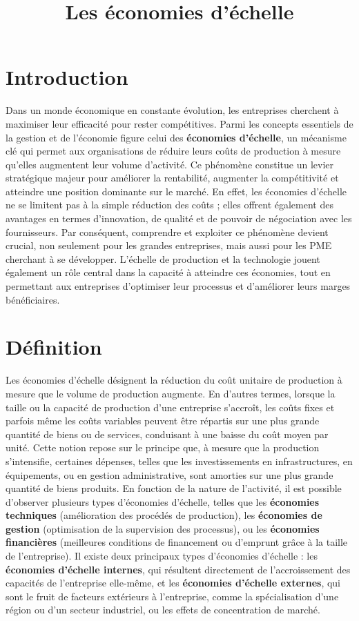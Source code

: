 \documentclass[a4paper,12pt]{article}
\title{Les économies d'échelle}
\author{}
\date{}
\begin{document}
\maketitle

\section*{Introduction}

Dans un monde économique en constante évolution, les entreprises cherchent à
maximiser leur efficacité pour rester compétitives. Parmi les concepts
essentiels de la gestion et de l’économie figure celui des \textbf{économies
  d’échelle}, un mécanisme clé qui permet aux organisations de réduire leurs
coûts de production à mesure qu’elles augmentent leur volume d’activité. Ce
phénomène constitue un levier stratégique majeur pour améliorer la rentabilité,
augmenter la compétitivité et atteindre une position dominante sur le marché.
En effet, les économies d’échelle ne se limitent pas à la simple réduction des
coûts ; elles offrent également des avantages en termes d'innovation, de
qualité et de pouvoir de négociation avec les fournisseurs. Par conséquent,
comprendre et exploiter ce phénomène devient crucial, non seulement pour les
grandes entreprises, mais aussi pour les PME cherchant à se développer.
L’échelle de production et la technologie jouent également un rôle central dans
la capacité à atteindre ces économies, tout en permettant aux entreprises
d’optimiser leur processus et d'améliorer leurs marges bénéficiaires.

\section*{Définition}

Les économies d’échelle désignent la réduction du coût unitaire de production à
mesure que le volume de production augmente. En d’autres termes, lorsque la
taille ou la capacité de production d’une entreprise s’accroît, les coûts fixes
et parfois même les coûts variables peuvent être répartis sur une plus grande
quantité de biens ou de services, conduisant à une baisse du coût moyen par
unité. Cette notion repose sur le principe que, à mesure que la production
s’intensifie, certaines dépenses, telles que les investissements en
infrastructures, en équipements, ou en gestion administrative, sont amorties
sur une plus grande quantité de biens produits. En fonction de la nature de
l’activité, il est possible d'observer plusieurs types d'économies d’échelle,
telles que les \textbf{économies techniques} (amélioration des procédés de
production), les \textbf{économies de gestion} (optimisation de la supervision
des processus), ou les \textbf{économies financières} (meilleures conditions de
financement ou d'emprunt grâce à la taille de l'entreprise). Il existe deux
principaux types d’économies d’échelle : les \textbf{économies d’échelle
  internes}, qui résultent directement de l’accroissement des capacités de
l’entreprise elle-même, et les \textbf{économies d’échelle externes}, qui sont
le fruit de facteurs extérieurs à l’entreprise, comme la spécialisation d’une
région ou d’un secteur industriel, ou les effets de concentration de marché.
\end{document}
